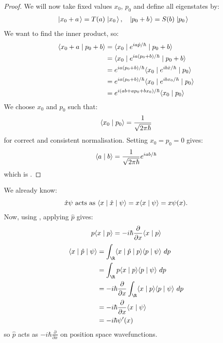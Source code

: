 \documentclass[../Main.tex]{subfiles}
\begin{document}
\begin{proof}
    We will now take fixed values $x_0$, $p_0$ and define all eigenstates by:
    \begin{align*}
        \left.\left|x_0 + a\right.\right\rangle &= T(a) \left.\left|x_0\right.\right\rangle, & \left.\left|p_0 + b\right.\right\rangle &= S(b) \left.\left|p_0\right.\right\rangle
    \end{align*}
    We want to find the inner product, so:
    \begin{align*}
        \langle x_0 + a\mid p_0 + b\rangle &= \langle x_0\mid e^{ia\hat{p}/\hbar}\mid p_0 + b\rangle \\
        &= \langle x_0\mid e^{ia(p_0 + b) / \hbar}\mid p_0 + b\rangle \\
        &= e^{ia(p_0 + b) / \hbar} \langle x_0\mid e^{ib\hat{x} / \hbar}\mid p_0\rangle \\
        &= e^{ia(p_0 + b) / \hbar} \langle x_0\mid e^{ibx_0 / \hbar}\mid p_0\rangle \\
        &= e^{i(ab + ap_0 + bx_0)/ \hbar} \langle x_0\mid p_0\rangle
    \end{align*}
    We choose $x_0$ and $p_0$ such that:
    \begin{equation*}
        \langle x_0\mid p_0\rangle = \frac{1}{\sqrt{2\pi\hbar}}
    \end{equation*}
    for correct and consistent normalisation. Setting $x_0 = p_0 = 0$ gives:
    \begin{equation*}
        \langle a\mid b\rangle = \frac{1}{\sqrt{2\pi\hbar}} e^{iab / \hbar}
    \end{equation*}
    which is .
\end{proof}
We already know:
\begin{equation*}
    \hat{x}\psi \text{ acts as } \langle x\mid\hat{x}\mid\psi\rangle = x\langle x\mid\psi\rangle = x\psi(x).
\end{equation*}
Now, using , applying $\hat{p}$ gives:
\begin{equation*}
    p\langle x\mid p\rangle = -i\hbar \frac{\partial}{\partial x} \langle x\mid p\rangle
\end{equation*}
\begin{align*}
    \opbraket{x}{\hat{p}}{\psi} &= \int_{\R} \opbraket{x}{\hat{p}}{p} \inn{p}{\psi}~dp \\
    &= \int_{\R} p\inn{x}{p} \inn{p}{\psi}~dp \\
    &= -i\hbar \frac{\partial }{\partial x} \int_{\R} \inn{x}{p} \inn{p}{\psi}~dp \\
    &= -i\hbar \frac{\partial }{\partial x} \inn{x}{\psi} \\
    &= -i\hbar \psi'(x)
\end{align*}
so $\hat{p}$ acts as $-i\hbar \frac{\partial }{\partial x}$ on position space wavefunctions.
\end{document}
